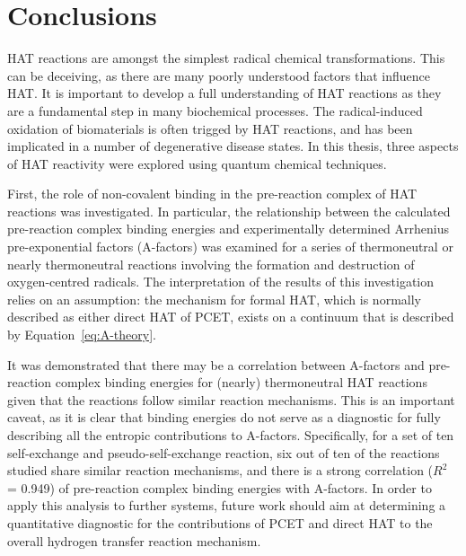 
\chapter{Conclusions}

\begin{doublespace}

HAT reactions are amongst the simplest radical chemical transformations. This
can be deceiving, as there are many poorly understood factors that influence
HAT. It is important to develop a full understanding of HAT reactions as they
are a fundamental step in many biochemical processes. The radical-induced
oxidation of biomaterials is often trigged by HAT reactions, and has been
implicated in a number of degenerative disease states. In this thesis, three
aspects of HAT reactivity were explored using quantum chemical techniques.

First, the role of non-covalent binding in the pre-reaction complex of HAT
reactions was investigated. In particular, the relationship between the
calculated pre-reaction complex binding energies and experimentally determined
Arrhenius pre-exponential factors (A-factors) was examined for a series of
thermoneutral or nearly thermoneutral reactions involving the formation and
destruction of oxygen-centred radicals. The interpretation of the results of
this investigation relies on an assumption: the mechanism for formal HAT, which
is normally described as either direct HAT of PCET, exists on a continuum that
is described by Equation~\ref{eq:A-theory}.

It was demonstrated that there may be a correlation between A-factors and
pre-reaction complex binding energies for (nearly) thermoneutral HAT reactions
given that the reactions follow similar reaction mechanisms. This is an
important caveat, as it is clear that binding energies do not serve as a
diagnostic for fully describing all the entropic contributions to A-factors.
Specifically, for a set of ten self-exchange and pseudo-self-exchange reaction,
six out of ten of the reactions studied share similar reaction mechanisms, and
there is a strong correlation ($R^2$ = 0.949) of pre-reaction complex binding
energies with A-factors. In order to apply this analysis to further systems,
future work should aim at determining a quantitative diagnostic for the
contributions of PCET and direct HAT to the overall hydrogen transfer reaction
mechanism.


\end{doublespace}
